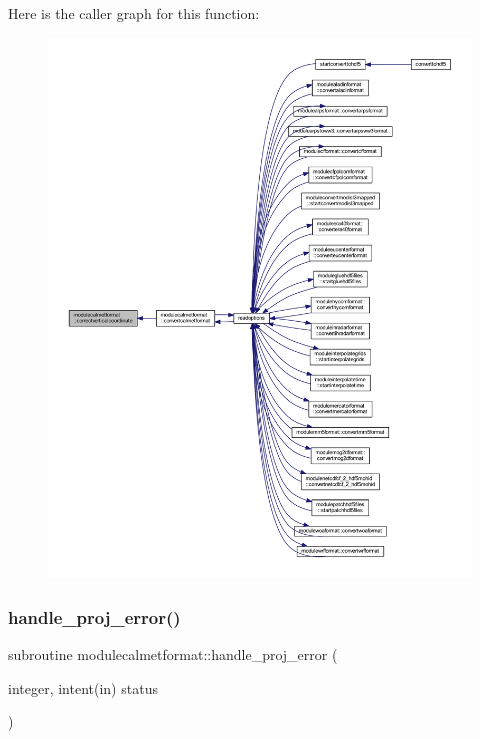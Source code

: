 Here is the caller graph for this function\+:\nopagebreak
\begin{figure}[H]
\begin{center}
\leavevmode
\includegraphics[width=350pt]{namespacemodulecalmetformat_aebd4c52189e33c42d4eddb372d91a66d_icgraph}
\end{center}
\end{figure}
\mbox{\label{namespacemodulecalmetformat_a2e6285b2b96d5b3545d7755b77b65502}} 
\subsubsection{\texorpdfstring{handle\+\_\+proj\+\_\+error()}{handle\_proj\_error()}}
{\footnotesize\ttfamily subroutine modulecalmetformat\+::handle\+\_\+proj\+\_\+error (\begin{DoxyParamCaption}\item[{integer, intent(in)}]{status }\end{DoxyParamCaption})\hspace{0.3cm}{\ttfamily [private]}}


